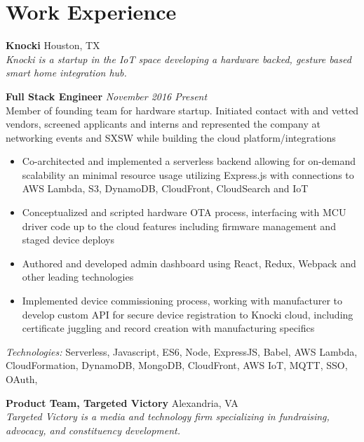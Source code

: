 \documentclass[10pt]{extarticle}
\begin{document}
\section*{Work Experience}
\textbf{Knocki} \hfill Houston, TX \\
\textit{Knocki is a startup in the IoT space developing a hardware backed, gesture based smart home integration hub.} \\
\begin{addmargin}[1em]{0em}
  \textbf{Full Stack Engineer} \hfill \textit{November 2016 \textendash{} Present} \\
  Member of founding team for hardware startup. Initiated contact with and vetted vendors, screened applicants and interns and represented the company at networking events and SXSW while building the cloud platform/integrations \\
  \vspace{-1.1em}
  \begin{itemize}
    \item Co-architected and implemented a serverless backend allowing for on-demand scalability an minimal resource usage utilizing Express.js with connections to AWS Lambda, S3, DynamoDB, CloudFront, CloudSearch and IoT
    \item Conceptualized and scripted hardware OTA process, interfacing with MCU driver code up to the cloud features including firmware management and staged device deploys
    \item Authored and developed admin dashboard using React, Redux, Webpack and other leading technologies
    \item Implemented device commissioning process, working with manufacturer to develop custom API for secure device registration to Knocki cloud, including certificate juggling and record creation with manufacturing specifics
  \end{itemize}
  \textit{Technologies:} Serverless, Javascript, ES6, Node, ExpressJS, Babel, AWS Lambda, CloudFormation, DynamoDB, MongoDB, CloudFront, AWS IoT, MQTT, SSO, OAuth,
\end{addmargin}
\textbf{Product Team, Targeted Victory} \hfill Alexandria, VA \\
\textit{Targeted Victory is a media and technology firm specializing in fundraising, advocacy, and constituency development.} \\
\end{document}
